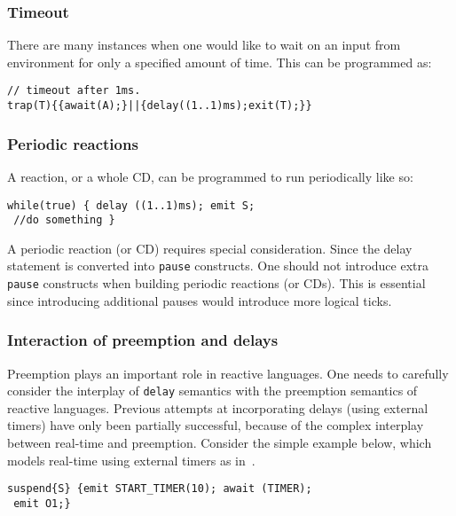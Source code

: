 \subsubsection{Timeout}
\label{sec:timeout}

There are many instances when one would like to wait on an input from
environment for only a specified amount of time. This can be programmed
as:
\begin{verbatim}
// timeout after 1ms.
trap(T){{await(A);}||{delay((1..1)ms);exit(T);}}
\end{verbatim}

\subsubsection{Periodic reactions}
\label{sec:periodic-reactions}

A reaction, or a whole CD, can be programmed to run periodically like
so:

\begin{verbatim}
while(true) { delay ((1..1)ms); emit S; 
 //do something }
\end{verbatim}
A periodic reaction (or CD) requires special consideration. Since the
delay statement is converted into \texttt{pause} constructs. One should
not introduce extra \texttt{pause} constructs when building periodic
reactions (or CDs). This is essential since introducing additional
pauses would introduce more logical ticks.

\subsubsection{Interaction of preemption and delays}
\label{sec:inter-preempt-delays}

Preemption plays an important role in reactive languages. One needs to
carefully consider the interplay of \texttt{delay} semantics with the
preemption semantics of reactive languages. Previous attempts at
incorporating delays (using external timers) have only been partially
successful, because of the complex interplay between real-time and
preemption. Consider the simple example below, which models real-time
using external timers as in~\cite{rsh94}.

\begin{verbatim}
suspend{S} {emit START_TIMER(10); await (TIMER); 
 emit O1;}
\end{verbatim}

